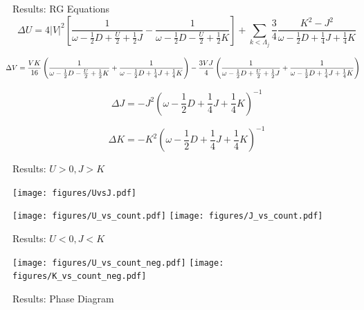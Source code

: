 \documentclass[aspectratio=169]{beamer}
\begin{document}
\begin{frame}{Results: RG Equations}
\[
\Delta U = 4|V|^2 \left[\frac{1}{\omega - \frac{1}{2}D + \frac{U}{2} + \frac{1}{2}J}  - \frac{1}{\omega - \frac{1}{2}D - \frac{U}{2} + \frac{1}{2}K}\right] + \sum_{k<\Lambda_j} \frac{3}{4}\frac{K^2 - J^2}{\omega - \frac{1}{2}D + \frac{1}{4}J + \frac{1}{4}K}
\]

\[
	\hspace*{-10pt}\Delta V = \frac{V K}{16}\left(\frac{1}{\omega - \frac{1}{2}D - \frac{U}{2} + \frac{1}{2}K} + \frac{1}{\omega - \frac{1}{2}D + \frac{1}{4}J + \frac{1}{4}K} \right) - \frac{3VJ}{4}\left( \frac{1}{\omega - \frac{1}{2}D + \frac{U}{2} + \frac{1}{2}J} + \frac{1}{\omega - \frac{1}{2}D + \frac{1}{4}J + \frac{1}{4}K} \right)
\]

\[
\Delta J = - J^2\left(\omega - \frac{1}{2}D + \frac{1}{4}J + \frac{1}{4}K\right)^{-1}
\]

\[
\Delta K = - K^2\left(\omega - \frac{1}{2}D + \frac{1}{4}J + \frac{1}{4}K\right)^{-1}
\]
\end{frame}

\begin{frame}{Results: \(U>0, J>K\)}
\begin{minipage}{0.6\textwidth}
\begin{center}
	\texttt{[image: figures/UvsJ.pdf]}
\end{center}
\end{minipage}
\begin{minipage}{0.39\textwidth}
\begin{center}
	\texttt{[image: figures/U\_vs\_count.pdf]}
	\texttt{[image: figures/J\_vs\_count.pdf]}
\end{center}
\end{minipage}
\end{frame}


\begin{frame}{Results: \(U<0, J<K\)}
	\vspace*{30pt}
\begin{center}
	\texttt{[image: figures/U\_vs\_count\_neg.pdf]}
	\texttt{[image: figures/K\_vs\_count\_neg.pdf]}
\end{center}
\end{frame}


\begin{frame}{Results: Phase Diagram}
\begin{center}
	\hspace*{-50pt}\def\svgwidth{0.8\columnwidth}
	
\end{center}
\end{frame}
\end{document}
